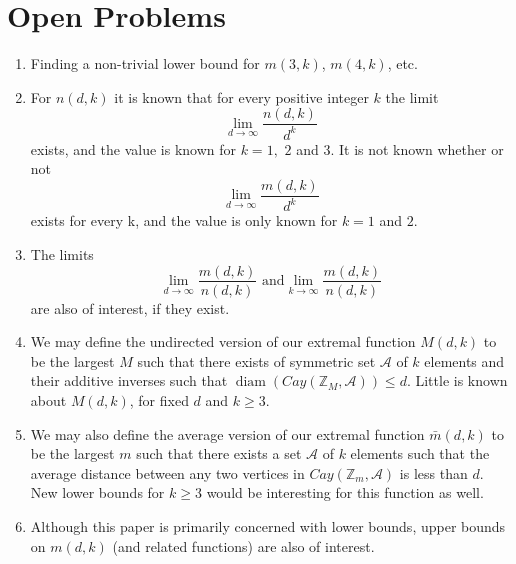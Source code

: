 \documentclass[11pt]{article}
\theoremstyle{definition}
\def\Z{\mbox{$\mathbb Z$}}
\def\diam{\operatorname{diam}}
\begin{document}
\section{Open Problems}
\begin{enumerate}[\bf 1.]
\item  Finding a non-trivial lower bound for $m(3,k)$, $m(4,k)$, etc.

\item  For $n(d,k)$ it is known that for every positive integer $k$ the limit 
\[
\lim_{d \to \infty}{\frac{n(d,k)}{d^k}}
\]
exists, and the value is known for $k = 1,$ $2$ and $3$.  It is not known whether or not 
\[
\lim_{d \to \infty}{\frac{m(d,k)}{d^k}}
\]
exists for every k, and the value is only known for $k = 1$ and $2$. \\
\item The limits
\[
\lim_{d \to \infty}{\frac{m(d,k)}{n(d,k)}} \text{ and}
\lim_{k \to \infty}{\frac{m(d,k)}{n(d,k)}}
\]
are also of interest, if they exist.
\item  We may define the undirected version of our extremal function $M(d,k)$ to be the largest $M$ such that there exists of symmetric set $\mathscr{A}$ of $k$ elements and their additive inverses such that $\diam(Cay(\Z_M,\mathscr{A})) \leq d$.  Little is known about $M(d,k)$, for fixed $d$ and $k \geq 3$. \\
\item We may also define the average version of our extremal function $\bar{m}(d,k)$ to be the largest $m$ such that there exists a set $\mathscr{A}$ of $k$ elements such that the average distance between any two vertices in $Cay(\Z_m,\mathscr{A})$ is less than $d$. New lower bounds for $k \geq 3$ would be interesting for this function as well.
\item Although this paper is primarily concerned with lower bounds, upper bounds on $m(d,k)$ (and related functions) are also of interest.

\end{enumerate}
\end{document}
